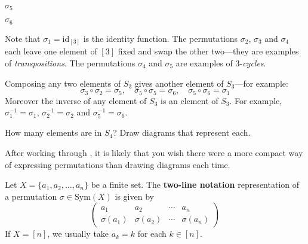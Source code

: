 \begin{example}
\begin{center}
\begin{minipage}{0.24\textwidth}
$\sigma_5$
\end{minipage}
%
\hfill
%
\begin{minipage}{0.24\textwidth}
\centering
{}

$\sigma_6$
\end{minipage}
\end{center}

Note that $\sigma_1 = \mathrm{id}_{[3]}$ is the identity function. The permutations $\sigma_2$, $\sigma_3$ and $\sigma_4$ each leave one element of $[3]$ fixed and swap the other two---they are examples of \textit{transpositions}. The permutations $\sigma_4$ and $\sigma_5$ are examples of $3$-\textit{cycles}.

Composing any two elements of $S_3$ gives another element of $S_3$---for example:
\[ \sigma_3 \circ \sigma_2 = \sigma_5, \quad \sigma_5 \circ \sigma_5 = \sigma_6, \quad \sigma_5 \circ \sigma_6 = \sigma_1 \]
Moreover the inverse of any element of $S_3$ is an element of $S_3$. For example, $\sigma_1^{-1} = \sigma_1$, $\sigma_2^{-1} = \sigma_2$ and $\sigma_5^{-1} = \sigma_6$.
\end{example}

\begin{exercise}
\label{exListElementsOfS4}
How many elements are in $S_4$? Draw diagrams that represent each.
\end{exercise}

After working through , it is likely that you wish there were a more compact way of expressing permutations than drawing diagrams each time.

\begin{definition}
\label{defTwoLineNotation}
Let $X = \{ a_1, a_2, \dots, a_n \}$ be a finite set. The \textbf{two-line notation} representation of a permutation $\sigma \in \mathrm{Sym}(X)$ is given by
\[ \begin{pmatrix} a_1 & a_2 & \cdots & a_n \\ \sigma(a_1) & \sigma(a_2) & \cdots & \sigma(a_n) \end{pmatrix} \]
If $X = [n]$, we usually take $a_k=k$ for each $k \in [n]$.
\end{definition}

